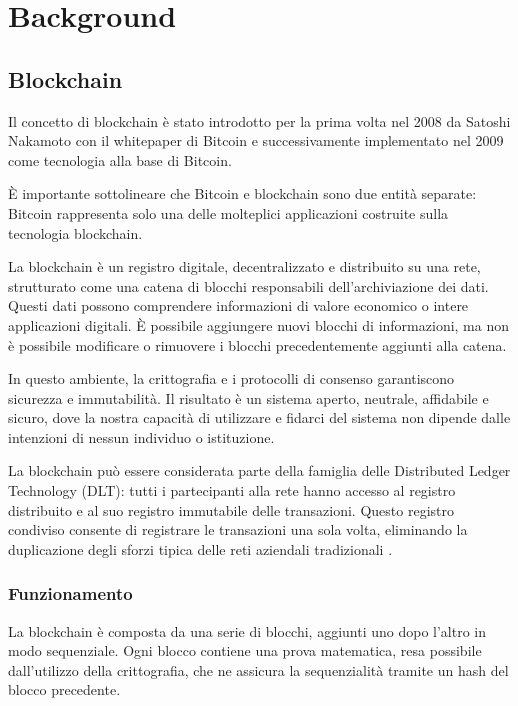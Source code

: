 \chapter{Background}\label{chapter:background}

\section{Blockchain}\label{sec:blockchain}
Il concetto di blockchain è stato introdotto per la prima volta nel 2008 da Satoshi Nakamoto con il whitepaper 
di Bitcoin \cite{nakamoto2008bitcoin} e successivamente implementato nel 2009 come tecnologia alla base di Bitcoin.

È importante sottolineare che Bitcoin e blockchain sono due entità separate: Bitcoin rappresenta solo una delle 
molteplici applicazioni costruite sulla tecnologia blockchain.

La blockchain è un registro digitale, decentralizzato e distribuito su una rete, strutturato come una catena di 
blocchi responsabili dell’archiviazione dei dati. Questi dati possono comprendere informazioni di valore economico 
o intere applicazioni digitali. È possibile aggiungere nuovi blocchi di informazioni, ma non è possibile modificare 
o rimuovere i blocchi precedentemente aggiunti alla catena.

In questo ambiente, la crittografia e i protocolli di consenso garantiscono sicurezza e immutabilità. Il risultato 
è un sistema aperto, neutrale, affidabile e sicuro, dove la nostra capacità di utilizzare e fidarci del sistema non 
dipende dalle intenzioni di nessun individuo o istituzione.

La blockchain può essere considerata parte della famiglia delle Distributed Ledger Technology (DLT): tutti i 
partecipanti alla rete hanno accesso al registro distribuito e al suo registro immutabile delle transazioni. Questo 
registro condiviso consente di registrare le transazioni una sola volta, eliminando la duplicazione degli sforzi 
tipica delle reti aziendali tradizionali \cite{chiap2019blockchain}. 

\subsection{Funzionamento}\label{subsec:funzionamento}
La blockchain è composta da una serie di blocchi, aggiunti uno dopo l’altro in modo sequenziale. Ogni blocco contiene 
una prova matematica, resa possibile dall’utilizzo della crittografia, che ne assicura la sequenzialità tramite un 
hash del blocco precedente.

